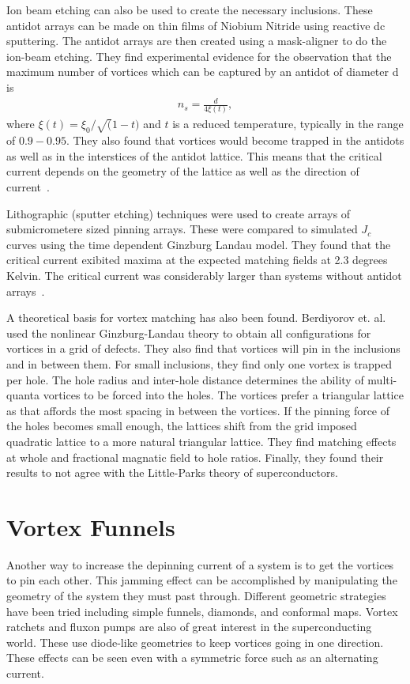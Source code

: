 Ion beam etching can also be used to create the necessary inclusions. These antidot arrays can be made on thin films of Niobium Nitride using reactive dc sputtering. The antidot arrays are then created using a mask-aligner to do the ion-beam etching. They find experimental evidence for the observation that the maximum number of vortices which can be captured by an antidot of diameter d is
\begin{eqnarray}
n_s = \frac {d} {4 \xi(t)}, 
\label{}
\end{eqnarray}
where $\xi(t) = \xi_0 / \sqrt(1-t)$ and $t$ is a reduced temperature, typically in the range of $0.9 - 0.95$. They also found that vortices would become trapped in the antidots as well as in the interstices of the antidot lattice. This means that the critical current depends on the geometry of the lattice as well as the direction of current~\cite{Thakur09}. 

Lithographic (sputter etching) techniques were used to create arrays of submicrometere sized pinning arrays. These were compared to simulated $J_c$ curves using the time dependent Ginzburg Landau model. They found that the critical current exibited maxima at the expected matching fields at 2.3 degrees Kelvin. The critical current was considerably larger than systems without antidot arrays~\cite{Sabatino10}.

A theoretical basis for vortex matching has also been found. Berdiyorov et. al. ~\cite{Berdiyorov06} used the nonlinear Ginzburg-Landau theory to obtain all configurations for vortices in a grid of defects. They also find that vortices will pin in the inclusions and in between them. For small inclusions, they find only one vortex is trapped per hole. The hole radius and inter-hole distance determines the ability of multi-quanta vortices to be forced into the holes. The vortices prefer a triangular lattice as that affords the most spacing in between the vortices. If the pinning force of the holes becomes small enough, the lattices shift from the grid imposed quadratic lattice to a more natural triangular lattice. They find matching effects at whole and fractional magnatic field to hole ratios. Finally, they found their results to not agree with the Little-Parks theory of superconductors.  

\section{Vortex Funnels}
Another way to increase the depinning current of a system is to get the vortices to pin each other. This jamming effect can be accomplished by manipulating the geometry of the system they must past through. Different geometric strategies have been tried including simple funnels, diamonds, and conformal maps. Vortex ratchets and fluxon pumps are also of great interest in the superconducting world. These use diode-like geometries to keep vortices going in one direction. These effects can be seen even with a symmetric force such as an alternating current.  

